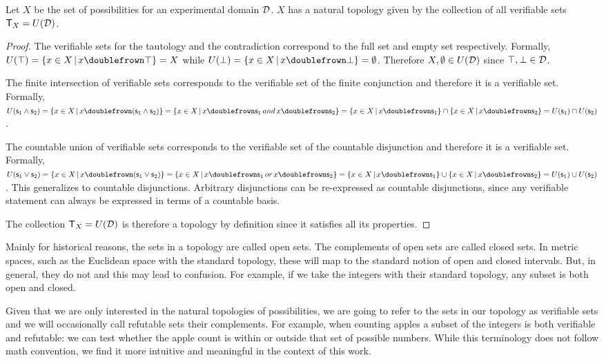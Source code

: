 \documentclass[11pt,letterpaper,fleqn]{memoir} %
\begin{document}
\begin{mathSection}
\begin{prop}
	Let $X$ be the set of possibilities for an experimental domain $\mathcal{D}$. $X$ has a natural topology given by the collection of all verifiable sets $\mathsf{T}_X=U(\mathcal{D})$.
\end{prop}

\begin{proof}
	The verifiable sets for the tautology and the contradiction correspond to the full set and empty set respectively. Formally, $U(\tautology) = \{ x \in X \, | \, x \comp \tautology\} = X$ while $U(\contradiction) = \{ x \in X \, | \, x \comp \contradiction\} = \emptyset$. Therefore $X, \emptyset \in U(\mathcal{D})$ since $\top, \bot \in \mathcal{D}$.

	The finite intersection of verifiable sets corresponds to the verifiable set of the finite conjunction and therefore it is a verifiable set. Formally, $U(\obs_1\AND\obs_2) = \{ x \in X \, | \, x \comp (\obs_1\AND\obs_2)\} =  \{ x \in X \, | \, x \comp \obs_1 \, and \, x \comp \obs_2\} = \{ x \in X \, | \, x \comp \obs_1\} \cap \{ x \in X \, | \, x \comp \obs_2\} = U(\obs_1) \cap U(\obs_2)$.

	The countable union of verifiable sets corresponds to the verifiable set of the countable disjunction and therefore it is a verifiable set. Formally, $U(\obs_1\OR\obs_2) = \{ x \in X \, | \, x \comp (\obs_1\OR\obs_2)\} =  \{ x \in X \, | \, x \comp \obs_1 \, or \, x \comp \obs_2\} = \{ x \in X \, | \, x \comp \obs_1\} \cup \{ x \in X \, | \, x \comp \obs_2\} = U(\obs_1) \cup U(\obs_2)$. This generalizes to countable disjunctions. Arbitrary disjunctions can be re-expressed as countable disjunctions, since any verifiable statement can always be expressed in terms of a countable basis.

	The collection $\mathsf{T}_X=U(\mathcal{D})$ is therefore a topology by definition since it satisfies all its properties.
\end{proof}
\end{mathSection}

Mainly for historical reasons, the sets in a topology are called open sets. The complements of open sets are called closed sets. In metric spaces, such as the Euclidean space with the standard topology, these will map to the standard notion of open and closed intervals. But, in general, they do not and this may lead to confusion. For example, if we take the integers with their standard topology, any subset is both open and closed.

Given that we are only interested in the natural topologies of possibilities, we are going to refer to the sets in our topology as verifiable sets and we will occasionally call refutable sets their complements. For example, when counting apples a subset of the integers is both verifiable and refutable: we can test whether the apple count is within or outside that set of possible numbers. While this terminology does not follow math convention, we find it more intuitive and meaningful in the context of this work.
\end{document}
